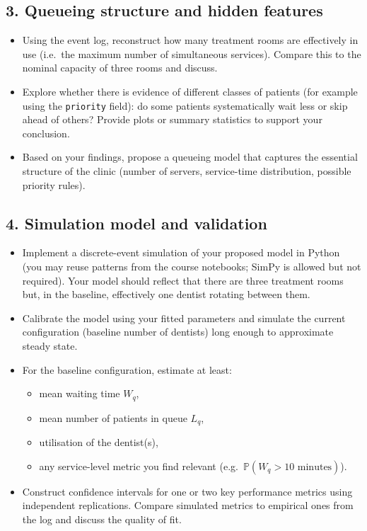\documentclass[a4paper,11pt]{article}
\begin{document}
\subsection*{3. Queueing structure and hidden features}
\begin{itemize}
  \item Using the event log, reconstruct how many treatment rooms are effectively in use (i.e.\ the maximum number of simultaneous services). Compare this to the nominal capacity of three rooms and discuss.
  \item Explore whether there is evidence of different classes of patients (for example using the \texttt{priority} field): do some patients systematically wait less or skip ahead of others? Provide plots or summary statistics to support your conclusion.
  \item Based on your findings, propose a queueing model that captures the essential structure of the clinic (number of servers, service-time distribution, possible priority rules).
\end{itemize}

\subsection*{4. Simulation model and validation}
\begin{itemize}
  \item Implement a discrete-event simulation of your proposed model in Python (you may reuse patterns from the course notebooks; SimPy is allowed but not required). Your model should reflect that there are three treatment rooms but, in the baseline, effectively one dentist rotating between them.
  \item Calibrate the model using your fitted parameters and simulate the current configuration (baseline number of dentists) long enough to approximate steady state.
  \item For the baseline configuration, estimate at least:
    \begin{itemize}
      \item mean waiting time $W_q$,
      \item mean number of patients in queue $L_q$,
      \item utilisation of the dentist(s),
      \item any service-level metric you find relevant (e.g.\ $\mathbb P(W_q > 10\text{ minutes})$).
    \end{itemize}
  \item Construct confidence intervals for one or two key performance metrics using independent replications. Compare simulated metrics to empirical ones from the log and discuss the quality of fit.
\end{itemize}
\end{document}
